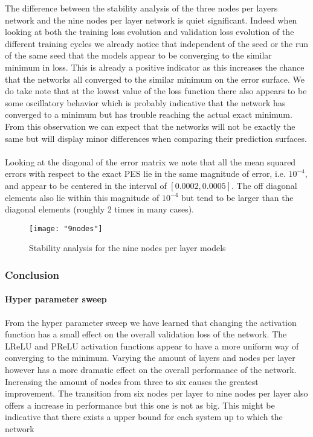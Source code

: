 \documentclass[12pt]{article}
\begin{document}
The difference between the stability analysis of the three nodes per layers network and the nine nodes per layer network is quiet significant. Indeed when looking at both the training loss evolution and validation loss evolution of the different training cycles we already notice that independent of the seed or the run of the same seed that the models appear to be converging to the similar minimum in loss. This is already a positive indicator as this increases the chance that the networks all converged to the similar minimum on the error surface. We do take note that at the lowest value of the loss function there also appears to be some oscillatory behavior which is probably indicative that the network has converged to a minimum but has trouble reaching the actual exact minimum. From this observation we can expect that the networks will not be exactly the same but will display minor differences when comparing their prediction surfaces.
\\
\\
Looking at the diagonal of the error matrix we note that all the mean squared errors with respect to the exact PES lie in the same magnitude of error, i.e. $10^{-4}$, and appear to be centered in the interval of $\left[0.0002, 0.0005\right]$. The off diagonal elements also lie within this magnitude of $10^{-4}$ but tend to be larger than the diagonal elements (roughly 2 times in many cases). 
\begin{figure}[H]
	\centering
	\texttt{[image: "9nodes"]}
	\caption{Stability analysis for the nine nodes per layer models}
\end{figure}

\subsubsection{Conclusion}

\paragraph{Hyper parameter sweep}
From the hyper parameter sweep we have learned that changing the activation function has a small effect on the overall validation loss of the network. The LReLU and PReLU activation functions appear to have a more uniform way of converging to the minimum. Varying the amount of layers and nodes per layer however has a more dramatic effect on the overall performance of the network. Increasing the amount of nodes from three to six causes the greatest improvement. The transition from six nodes per layer to nine nodes per layer also offers a increase in performance but this one is not as big. This might be indicative that there exists a upper bound for each system up to which the network   
\end{document}
